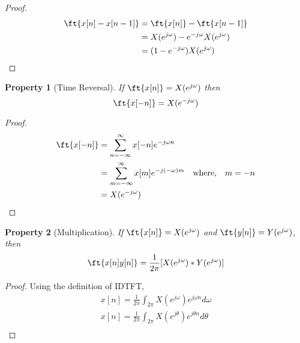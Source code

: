 \documentclass{home_assignment}
\newtheorem{theorem}{Property}
\begin{document}
{\begin{proof}
\begin{equation*}
\begin{aligned}
                            \ft{x[n]-x[n-1]}&=\ft{x[n]}-\ft{x[n-1]}\\
                            &=X(e^{j\omega})-e^{-j\omega}X(e^{j\omega})\\
                            &=(1-e^{-j\omega})X(e^{j\omega})
                        \end{aligned}
                        \end{equation*}
                        \end{proof}
                        \begin{theorem}[Time Reversal]
                            If $\ft{x[n]}=X(e^{j\omega})$ then
                            \begin{equation*}
                            \ft{x[-n]}=X(e^{-j\omega})
                            \end{equation*}
                            \end{theorem}
                            \begin{proof}
                            \begin{equation*}
                            \begin{aligned} 
                            \ft{x[-n]}&=\sum_{n=-\infty}^{\infty} x[-n] e^{-j\omega n} \\
                            &=\sum_{m=-\infty}^{\infty} x[m] e^{-j(-\omega) m} \quad \text{where,}\quad m=-n\\
                            &=X(e^{-j\omega})
                            \end{aligned}
                            \end{equation*}
                            \end{proof}
                        \begin{theorem}[Multiplication]
    If $\ft{x[n]}=X(e^{j\omega})$ and $\ft{y[n]}=Y(e^{j\omega})$, then
    \begin{equation*}
    \ft{x[n]y[n]}=\frac{1}{2\pi}[X(e^{j\omega})*Y(e^{j\omega})]
    \end{equation*}
    \end{theorem}
    \begin{proof}Using the definition of IDTFT,
    \begin{equation*}
    \begin{aligned} 
        x[n]=\frac{1}{2\pi}\int_{2\pi}X(e^{j\omega})e^{j\omega n} d\omega\\
        x[n]=\frac{1}{2\pi}\int_{2\pi}X(e^{j\theta})e^{j\theta n} d\theta\\

\end{aligned}
\end{equation*}
\end{proof}}
\end{document}
